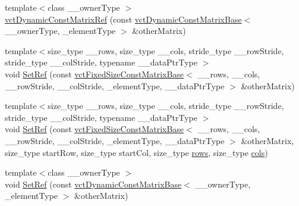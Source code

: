 \begin{DoxyCompactItemize}
\item 
{\footnotesize template$<$class \-\_\-\-\_\-owner\-Type $>$ }\\\hyperlink{classvct_dynamic_const_matrix_ref_a69f3ea1f5abeb8a3cd1d418c541f6e8c}{vct\-Dynamic\-Const\-Matrix\-Ref} (const \hyperlink{classvct_dynamic_const_matrix_base}{vct\-Dynamic\-Const\-Matrix\-Base}$<$ \-\_\-\-\_\-owner\-Type, \-\_\-element\-Type $>$ \&other\-Matrix)
\item 
{\footnotesize template$<$size\-\_\-type \-\_\-\-\_\-rows, size\-\_\-type \-\_\-\-\_\-cols, stride\-\_\-type \-\_\-\-\_\-row\-Stride, stride\-\_\-type \-\_\-\-\_\-col\-Stride, typename \-\_\-\-\_\-data\-Ptr\-Type $>$ }\\void \hyperlink{classvct_dynamic_const_matrix_ref_a7fd497624ca76b2c666049323b1fc7fa}{Set\-Ref} (const \hyperlink{classvct_fixed_size_const_matrix_base}{vct\-Fixed\-Size\-Const\-Matrix\-Base}$<$ \-\_\-\-\_\-rows, \-\_\-\-\_\-cols, \-\_\-\-\_\-row\-Stride, \-\_\-\-\_\-col\-Stride, \-\_\-element\-Type, \-\_\-\-\_\-data\-Ptr\-Type $>$ \&other\-Matrix)
\item 
{\footnotesize template$<$size\-\_\-type \-\_\-\-\_\-rows, size\-\_\-type \-\_\-\-\_\-cols, stride\-\_\-type \-\_\-\-\_\-row\-Stride, stride\-\_\-type \-\_\-\-\_\-col\-Stride, typename \-\_\-\-\_\-data\-Ptr\-Type $>$ }\\void \hyperlink{classvct_dynamic_const_matrix_ref_afb23e69c7cf3542416826bb6a5c02949}{Set\-Ref} (const \hyperlink{classvct_fixed_size_const_matrix_base}{vct\-Fixed\-Size\-Const\-Matrix\-Base}$<$ \-\_\-\-\_\-rows, \-\_\-\-\_\-cols, \-\_\-\-\_\-row\-Stride, \-\_\-\-\_\-col\-Stride, \-\_\-element\-Type, \-\_\-\-\_\-data\-Ptr\-Type $>$ \&other\-Matrix, size\-\_\-type start\-Row, size\-\_\-type start\-Col, size\-\_\-type \hyperlink{classvct_dynamic_const_matrix_base_a5eac13be2207ebeb8766cde379d73438}{rows}, size\-\_\-type \hyperlink{classvct_dynamic_const_matrix_base_aa6c51d41a100da49a7e7ac7edb20ecd9}{cols})
\item 
{\footnotesize template$<$class \-\_\-\-\_\-owner\-Type $>$ }\\void \hyperlink{classvct_dynamic_const_matrix_ref_ae76ec58a0046efd4b7efe4b07646fffd}{Set\-Ref} (const \hyperlink{classvct_dynamic_const_matrix_base}{vct\-Dynamic\-Const\-Matrix\-Base}$<$ \-\_\-\-\_\-owner\-Type, \-\_\-element\-Type $>$ \&other\-Matrix)
\end{DoxyCompactItemize}
{\bf }\par
